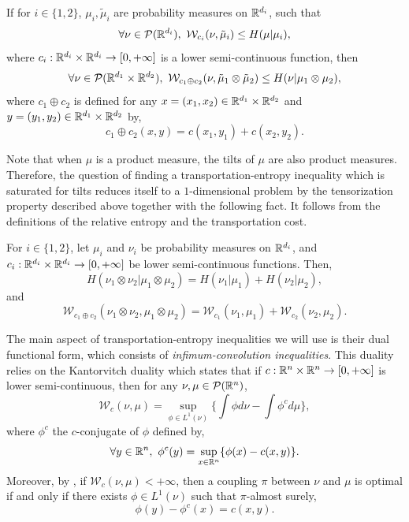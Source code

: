 \documentclass[a4paper,oneside,11pt]{article}
\begin{document}
\begin{Lem} \label{tensor}
If for $i\in \{1,2\}$,  $\mu_i, \tilde \mu_i$ are probability measures on $\mathbb{R}^{d_i}$, such that
$$ \forall \nu \in \mathcal{P}(\RR^{d_i}), \ \mathcal{W}_{c_i}(\nu, \tilde \mu_i) \leq H(\mu| \mu_i),$$
where $c_i : \mathbb{R}^{d_i} \times \mathbb{R}^{d_i}\to [0,+\infty]$ is a lower semi-continuous function, then 
$$ \forall \nu \in \mathcal{P}(\mathbb{R}^{d_1}\times \mathbb{R}^{d_2}), \ \mathcal{W}_{c_1 \oplus c_2}(\nu, \tilde \mu_1\otimes \tilde \mu_2) \leq H(\nu | \mu_1\otimes \mu_2),$$
where $c_1 \oplus c_2$ is defined for any $x=(x_1,x_2) \in \mathbb{R}^{d_1} \times \mathbb{R}^{d_2}$ and $y =(y_1,y_2) \in \mathbb{R}^{d_1} \times \mathbb{R}^{d_2}$ by,
$$ c_1 \oplus c_2(x,y) = c(x_1,y_1) + c(x_2,y_2).$$
\end{Lem}
Note that when $\mu$ is a product measure, the tilts of $\mu$ are also product measures. Therefore, the question of finding a transportation-entropy inequality which is saturated for tilts reduces itself to a $1$-dimensional problem by the tensorization property described above together with the following fact. It follows from the definitions of the relative entropy and the transportation cost.

\begin{Fact}\label{tensoreq}
For $i\in \{1,2\}$, let $\mu_i$ and $\nu_i$  be probability measures on $\mathbb{R}^{d_i}$, and $c_i : \mathbb{R}^{d_i} \times \mathbb{R}^{d_i} \to[0,+\infty]$ be lower semi-continuous functions. Then,
$$ H(\nu_1 \otimes \nu_2 | \mu_1 \otimes \mu_2) = H(\nu_1|\mu_1) + H(\nu_2|\mu_2),$$
and
$$\mathcal{W}_{c_1 \oplus c_2} (\nu_1 \otimes \nu_2, \mu_1 \otimes \mu_2) = \mathcal{W}_{c_1}(\nu_1,\mu_1) + \mathcal{W}_{c_2}(\nu_2,\mu_2).$$

\end{Fact}



The main aspect of transportation-entropy inequalities we will use is their dual functional form, which consists of \textit{infimum-convolution inequalities}. This duality relies on the Kantorvitch duality \cite[Theorem 5.10]{Villani} which states that if $c : \mathbb{R}^n \times \mathbb{R}^n \to [0,+\infty]$ is lower semi-continuous, then for any $\nu,\mu \in \mathcal{P}(\mathbb{R}^n)$,
\begin{equation} \label{Kantduality} \mathcal{W}_c(\nu, \mu) = \sup_{ \phi \in L^1(\nu)} \big\{ \int \phi d \nu - \int \phi^c d\mu\big\},\end{equation}
where $\phi^c$ the $c$-conjugate of $\phi$ defined by,
$$\forall y\in \mathbb{R}^n,\ \phi^c(y) = \sup_{ x\in \mathbb{R}^n} \{ \phi(x) -c(x,y)\}.$$
Moreover, by \cite[Theorem 5.10, (ii)]{Villani}, if $\mathcal{W}_c(\nu,\mu) <+\infty$, then a coupling $\pi$ between $\nu$ and $\mu$ is optimal if and only if there exists $\phi \in L^1(\nu)$ such that $\pi$-almost surely,
\begin{equation} \label{Kantdualityopt} \phi(y) - \phi^c(x) = c(x,y).\end{equation}
\end{document}
